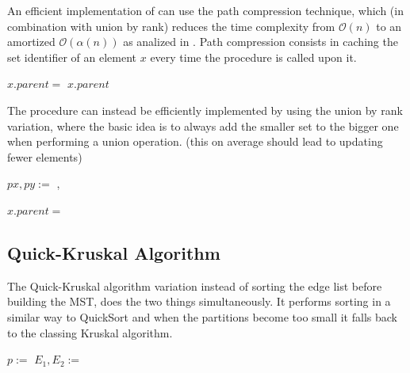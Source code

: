 \documentclass{article}
\begin{document}
An efficient implementation of  can use the path compression technique, which (in combination with union by rank) reduces the time complexity from $\mathcal{O}(n)$ to an amortized $\mathcal{O}(\alpha(n))$ as analized in \cite{TARJAN1979110}. Path compression consists in caching the set identifier of an element $x$ every time the  procedure is called upon it. 

\begin{algorithm}
    \begin{algorithmic}
         
                \State $x.parent = $ 
            \EndIf
            \State\Return $x.parent$
        \EndFunction
    \end{algorithmic}
\end{algorithm}

The  procedure can instead be efficiently implemented by using the union by rank variation, where the basic idea is to always add the smaller set to the bigger one when performing a union operation. (this on average should lead to updating fewer elements)

\begin{algorithm}
    \begin{algorithmic}
         
            \State $px, py := $ , 
                    \State {}
                
                \EndIf
                \State $x.parent = $ 
            \EndIf
        \EndFunction
    \end{algorithmic}
\end{algorithm}

\subsection{Quick-Kruskal Algorithm}

The Quick-Kruskal algorithm variation instead of sorting the edge list before building the MST, does the two things simultaneously. It performs sorting in a similar way to QuickSort and when the partitions become too small it falls back to the classing Kruskal algorithm.

\begin{algorithm}
    \begin{algorithmic}
                \State \Return {}
            \EndIf
            \State $p := $ 
            \State $E_1, E_2 := $ 
            \State {}
                \State {}
            \EndIf
        \EndFunction
    \end{algorithmic}
\end{algorithm}
\end{document}

